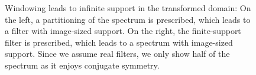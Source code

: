 \begin{figure}
	\caption[Windowing in time- and frequency domain]{%
		Windowing leads to infinite support in the transformed domain:
		On the left, a partitioning of the spectrum is prescribed, which leads to a filter with image-sized support.
		On the right, the finite-support filter is prescribed, which leads to a spectrum with image-sized support.
		Since we assume real filters, we only show half of the spectrum as it enjoys conjugate symmetry.
	}%
	\label{fig:windowing}
\end{figure}

